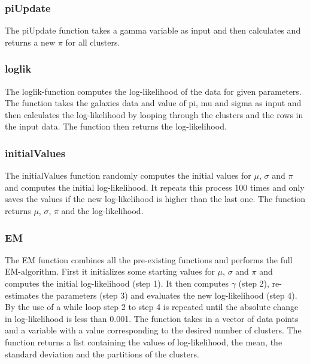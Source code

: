 \documentclass{article}\usepackage[]{graphicx}\usepackage[]{color}
\begin{document}
\subsubsection*{piUpdate}

The piUpdate function takes a gamma variable as input and then calculates and returns a new $\pi$ for all clusters.



\subsubsection*{loglik}
The loglik-function computes the log-likelihood of the data for given parameters. The function takes the galaxies data and value of pi, mu and sigma as input and then calculates the log-likelihood by looping through the clusters and the rows in the input data. The function then returns the log-likelihood.



\subsubsection*{initialValues}

The initialValues function randomly computes the initial values for $\mu$, $\sigma$ and $\pi$ and computes the initial log-likelihood. It repeats this process 100 times and only saves the values if the new log-likelihood is higher than the last one. The function returns $\mu$, $\sigma$, $\pi$ and the log-likelihood.



\subsubsection*{EM}

The EM function combines all the pre-existing functions and performs the full EM-algorithm. First it initializes some starting values for $\mu$, $\sigma$ and $\pi$ and computes the initial log-likelihood (step 1). It then computes $\gamma$ (step 2), re-estimates the parameters (step 3) and evaluates the new log-likelihood (step 4). By the use of a while loop step 2 to step 4 is repeated until the absolute change in log-likelihood is less than 0.001. The function takes in a vector of data points and a variable with a value corresponding to the desired number of clusters. The function returns a list containing the values of log-likelihood, the mean, the standard deviation and the partitions of the clusters.
\end{document}
